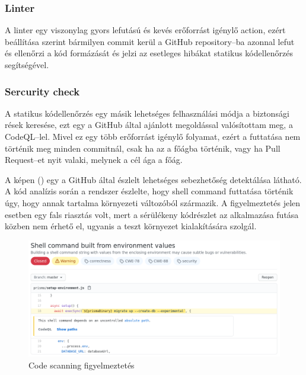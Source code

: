 \subsubsection{Linter}
A linter egy viszonylag gyors lefutású és kevés erőforrást igénylő action, ezért beállítása szerint bármilyen commit kerül a GitHub repository–ba azonnal lefut és ellenőrzi a kód formázását és jelzi az esetleges hibákat statikus kódellenőrzés segítségével.


\subsubsection{Sercurity check}
A statikus kódellenőrzés egy másik lehetséges felhasználási módja a biztonsági rések keresése, ezt egy a GitHub által ajánlott megoldással valósítottam meg, a CodeQL–lel.
Mivel ez egy több erőforrást igénylő folyamat, ezért a futtatása nem történik meg minden commitnál, csak ha az a főágba történik, vagy ha Pull Request–et nyit valaki, melynek a cél ága a főág.

A képen () egy a GitHub által észlelt lehetséges sebezhetőség detektálása látható.
A kód analízis során a rendszer észlelte, hogy shell command futtatása történik úgy, hogy annak tartalma környezeti változóból származik.
A figyelmeztetés jelen esetben egy fals riasztás volt, mert a sérülékeny kódrészlet az alkalmazása futása közben nem érhető el, ugyanis a teszt környezet kialakítására szolgál.

\begin{figure}[!ht]
  \centering
  \includegraphics[width=150mm, keepaspectratio]{figures/security.png}
  \caption{Code scanning figyelmeztetés}
  \label{fig:securityCheck}
\end{figure}

